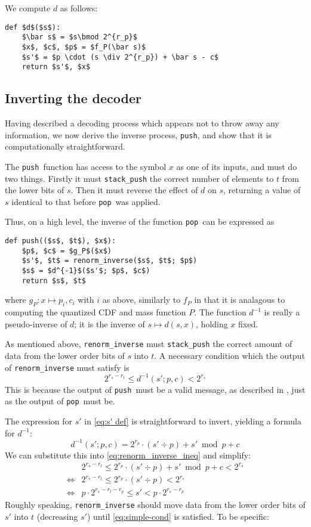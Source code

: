 \documentclass{article}
\theoremstyle{definition}
\newcommand{\push}{\texttt{push}}
\newcommand{\pop}{\texttt{pop}}
\begin{document}
We compute \(d\) as follows:
\begin{lstlisting}
def $d$($s$):
    $\bar s$ = $s\bmod 2^{r_p}$
    $x$, $c$, $p$ = $f_P(\bar s)$
    $s'$ = $p \cdot (s \div 2^{r_p}) + \bar s - c$
    return $s'$, $x$
\end{lstlisting}

\subsection{Inverting the decoder}
Having described a decoding process which appears not to throw away any
information, we now derive the inverse process, \push, and show that it is
computationally straightforward.

The \push\ function has access to the symbol \(x\) as one of its inputs, and
must do two things. Firstly it must \texttt{stack\_push} the correct number of
elements to \(t\) from the lower bits of \(s\). Then it must reverse the effect
of \(d\) on \(s\), returning a value of \(s\) identical to that before \pop\
was applied.

Thus, on a high level, the inverse of the function \pop\ can be expressed as
\begin{lstlisting}
def push(($s$, $t$), $x$):
    $p$, $c$ = $g_P$($x$)
    $s'$, $t$ = renorm_inverse($s$, $t$; $p$)
    $s$ = $d^{-1}$($s'$; $p$, $c$)
    return $s$, $t$
\end{lstlisting}
where \(g_P:x\mapsto p_i, c_i\) with \(i\) as above, similarly to \(f_P\) in
that it is analagous to computing the quantized CDF and mass function \(P\).
The function \(d^{-1}\) is really a pseudo-inverse of \(d\); it is the inverse
of \(s\mapsto d(s, x)\), holding \(x\) fixed.

As mentioned above, \texttt{renorm\_inverse} must \texttt{stack\_push} the
correct amount of data from the lower order bits of \(s\) into \(t\). A
necessary condition which the output of \texttt{renorm\_inverse} must satisfy
is
\begin{equation}\label{eq:renorm_inverse_ineq}
  2^{r_s - r_t} \leq d^{-1}(s'; p, c) < 2^{r_s}
\end{equation}
This is because the output of \push\ must be a valid message, as described in
\Cref{sec:message}, just as the output of \pop\ must be.

The expression for \(s'\) in \cref{eq:s' def} is straightforward to invert,
yielding a formula for
\(d^{-1}\):
\begin{equation}
  d^{-1}(s'; p, c) = 2^{r_p} \cdot (s' \div p) + s' \bmod p + c
\end{equation}
We can substitute this into \cref{eq:renorm_inverse_ineq} and simplify:
\begin{align}
  &2^{r_s - r_t} \leq 2^{r_p} \cdot (s' \div p) + s' \bmod p + c < 2^{r_s}\\
  \iff&2^{r_s - r_t} \leq 2^{r_p} \cdot (s' \div p) < 2^{r_s}\\
  \iff&p\cdot2^{r_s - r_t - r_p}\leq s' < p\cdot 2^{r_s -
  r_p}\label{eq:simple-cond}
\end{align}
Roughly speaking, \texttt{renorm\_inverse} should move data from the lower
order bits of \(s'\) into \(t\) (decreasing \(s'\)) until \cref{eq:simple-cond}
is satisfied. To be specific:
\end{document}

